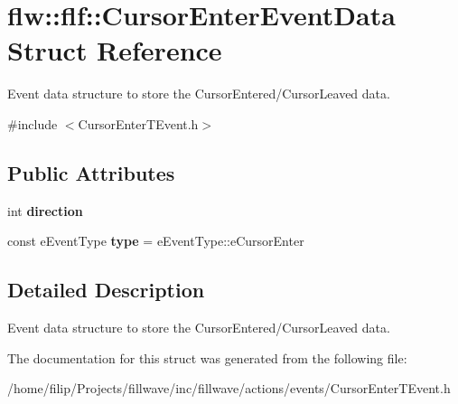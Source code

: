\hypertarget{structflw_1_1flf_1_1CursorEnterEventData}{}\section{flw\+:\+:flf\+:\+:Cursor\+Enter\+Event\+Data Struct Reference}
\label{structflw_1_1flf_1_1CursorEnterEventData}


Event data structure to store the Cursor\+Entered/\+Cursor\+Leaved data.  




{\ttfamily \#include $<$Cursor\+Enter\+T\+Event.\+h$>$}

\subsection*{Public Attributes}
\begin{DoxyCompactItemize}
\item 
int {\bfseries direction}\hypertarget{structflw_1_1flf_1_1CursorEnterEventData_a30ebfc482500e3cfaa542a67b1e644cc}{}\label{structflw_1_1flf_1_1CursorEnterEventData_a30ebfc482500e3cfaa542a67b1e644cc}

\item 
const e\+Event\+Type {\bfseries type} = e\+Event\+Type\+::e\+Cursor\+Enter\hypertarget{structflw_1_1flf_1_1CursorEnterEventData_a55bb1c34d999de90c23d30dc4f6ed4e4}{}\label{structflw_1_1flf_1_1CursorEnterEventData_a55bb1c34d999de90c23d30dc4f6ed4e4}

\end{DoxyCompactItemize}


\subsection{Detailed Description}
Event data structure to store the Cursor\+Entered/\+Cursor\+Leaved data. 

The documentation for this struct was generated from the following file\+:\begin{DoxyCompactItemize}
\item 
/home/filip/\+Projects/fillwave/inc/fillwave/actions/events/Cursor\+Enter\+T\+Event.\+h\end{DoxyCompactItemize}
